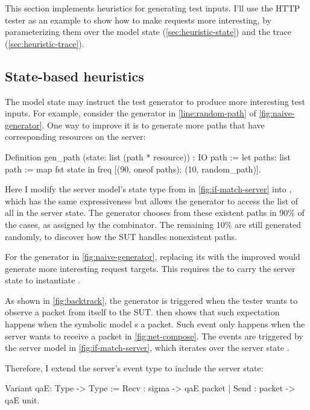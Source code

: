 This section implements heuristics for generating test inputs.  I'll use the
HTTP tester as an example to show how to make requests more interesting, by
parameterizing them over the model state (\autoref{sec:heuristic-state}) and the
trace (\autoref{sec:heuristic-trace}).

\subsection{State-based heuristics}
\label{sec:heuristic-state}
The model state may instruct the test generator to produce more interesting test
inputs.  For example, consider the  generator in
\autoref{line:random-path} of \autoref{fig:naive-generator}.  One way to improve
it is to generate more paths that have corresponding resources on the server:
\begin{coq}
  Definition gen_path (state: list (path * resource)) : IO path :=
    let paths: list path := map fst state in
    freq [(90, oneof paths);
          (10, random_path)].
\end{coq}

Here I modify the server model's state type  from  in \autoref{fig:if-match-server} into , which has the same expressiveness but allows the generator to
access the list of all  in the server state.  The generator chooses
from these existent paths in 90\% of the cases, as assigned by the 
combinator.  The remaining 10\% are still generated randomly, to discover how
the SUT handles nonexistent paths.

For the  generator in \autoref{fig:naive-generator}, replacing
its  with the improved  would generate more
interesting request targets.  This requires the  to carry the
server state to instantiate .

As shown in \autoref{fig:backtrack}, the  generator is triggered
when the tester wants to observe a packet from itself to the SUT.
 then shows that such  expectation
happens when the symbolic model s a packet.  Such  event
only happens when the server wants to receive a packet in
\autoref{fig:net-compose}.  The  events are triggered by the server
model in \autoref{fig:if-match-server}, which iterates over the server state
.

Therefore, I extend the server's  event type to include the server
state:
\begin{coq}
  Variant qaE: Type -> Type :=
    Recv : sigma      -> qaE packet
  | Send : packet -> qaE unit.
\end{coq}

